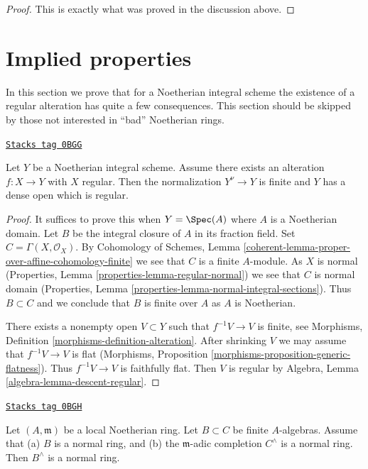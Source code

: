 \begin{proof}
This is exactly what was proved in the discussion above.
\end{proof}

\section{Implied properties}
\label{resolve-section-existence-gives}
In this section we prove that for a Noetherian integral scheme
the existence of a regular alteration has quite a few consequences.
This section should be skipped by those not interested in
``bad'' Noetherian rings.

\begin{lemma}
\label{resolve-lemma-regular-alteration-implies}
\href{https://stacks.math.columbia.edu/tag/0BGG}{\texttt{Stacks tag 0BGG}}

Let $Y$ be a Noetherian integral scheme. Assume there exists an alteration
$f : X \to Y$ with $X$ regular. Then the normalization $Y^\nu \to Y$
is finite and $Y$ has a dense open which is regular.
\end{lemma}

\begin{proof}
It suffices to prove this when $Y = \Spec(A)$ where $A$ is a Noetherian domain.
Let $B$ be the integral closure of $A$ in its fraction field.
Set $C = \Gamma(X, \mathcal{O}_X)$. By
Cohomology of Schemes, Lemma
\ref{coherent-lemma-proper-over-affine-cohomology-finite}
we see that $C$ is a finite $A$-module. As $X$ is normal
(Properties, Lemma \ref{properties-lemma-regular-normal})
we see that $C$ is normal domain
(Properties, Lemma \ref{properties-lemma-normal-integral-sections}).
Thus $B \subset C$ and we conclude that $B$ is finite over $A$
as $A$ is Noetherian.

\medskip\noindent
There exists a nonempty open $V \subset Y$ such that $f^{-1}V \to V$
is finite, see Morphisms, Definition \ref{morphisms-definition-alteration}.
After shrinking $V$ we may assume that $f^{-1}V \to V$ is flat
(Morphisms, Proposition \ref{morphisms-proposition-generic-flatness}).
Thus $f^{-1}V \to V$ is faithfully flat. Then $V$ is regular by
Algebra, Lemma \ref{algebra-lemma-descent-regular}.
\end{proof}

\begin{lemma}
\label{resolve-lemma-algebra-helper}
\href{https://stacks.math.columbia.edu/tag/0BGH}{\texttt{Stacks tag 0BGH}}

Let $(A, \mathfrak m)$ be a local Noetherian ring. Let $B \subset C$
be finite $A$-algebras. Assume that (a) $B$ is a normal ring, and
(b) the $\mathfrak m$-adic completion $C^\wedge$ is a normal ring.
Then $B^\wedge$ is a normal ring.
\end{lemma}

